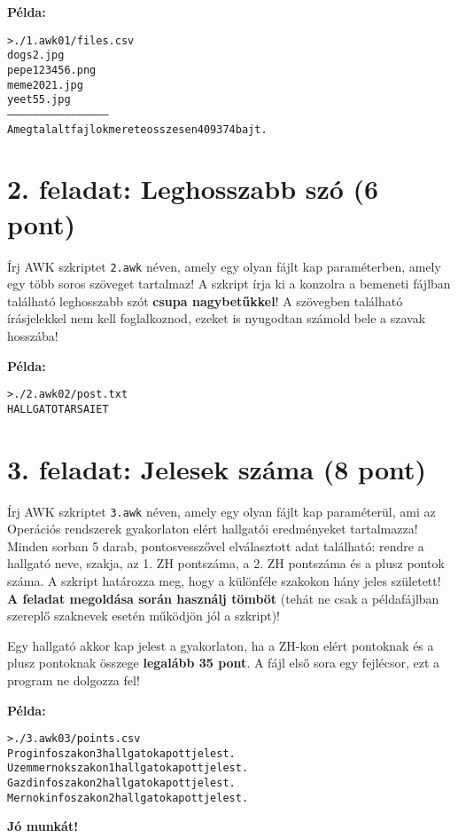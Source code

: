 \documentclass[a4paper,12pt]{article}
\begin{document}
\textbf{Példa:}

\begin{alltt}
> ./1.awk 01/files.csv
dogs2.jpg 
pepe123456.png 
meme2021.jpg 
yeet55.jpg 
----------------------------------------------- 
A megtalalt fajlok merete osszesen 409374 bajt.
\end{alltt}

\section*{2. feladat: Leghosszabb szó (6 pont)}

Írj AWK szkriptet \texttt{2.awk} néven, amely egy olyan fájlt kap paraméterben, amely egy több soros szöveget tartalmaz! A szkript írja ki a konzolra a bemeneti fájlban található leghosszabb szót \textbf{csupa nagybetűkkel}! A szövegben található írásjelekkel nem kell foglalkoznod, ezeket is nyugodtan számold bele a szavak hosszába!

\textbf{Példa:}
\begin{alltt}
> ./2.awk 02/post.txt
HALLGATOTARSAIET
\end{alltt}

\section*{3. feladat: Jelesek száma (8 pont)}

Írj AWK szkriptet \texttt{3.awk} néven, amely egy olyan fájlt kap paraméterül, ami az Operációs rendszerek gyakorlaton elért hallgatói eredményeket tartalmazza! Minden sorban 5 darab, pontosvesszővel elválasztott adat található: rendre a hallgató neve, szakja, az 1. ZH pontszáma, a 2. ZH pontszáma és a plusz pontok száma. A szkript határozza meg, hogy a különféle szakokon hány jeles született! \textbf{A feladat megoldása során használj tömböt} (tehát ne csak a példafájlban szereplő szaknevek esetén működjön jól a szkript)!

Egy hallgató akkor kap jelest a gyakorlaton, ha a ZH-kon elért pontoknak és a plusz pontoknak összege \textbf{legalább 35 pont}. A fájl első sora egy fejlécsor, ezt a program ne dolgozza fel!

\textbf{Példa:}
\begin{alltt}
> ./3.awk 03/points.csv
Proginfo szakon 3 hallgato kapott jelest.
Uzemmernok szakon 1 hallgato kapott jelest. 
Gazdinfo szakon 2 hallgato kapott jelest. 
Mernokinfo szakon 2 hallgato kapott jelest.
\end{alltt}

\textbf{Jó munkát!}
\end{document}
